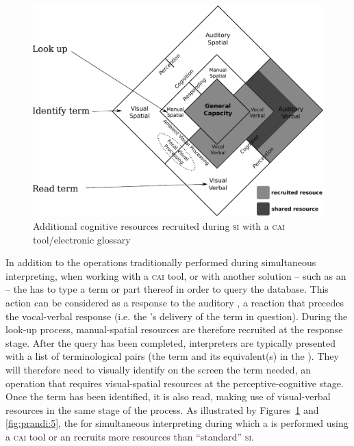 \documentclass[output=paper]{langsci/langscibook}
\begin{document}
\begin{figure}[t]
        \includegraphics[height=.4\textheight]{figures/fig2-4.pdf}
\caption{Additional cognitive resources recruited during \textsc{si} with a \textsc{cai} tool/electronic glossary\label{fig:prandi:4}}
\end{figure}

In addition to the operations traditionally performed during simultaneous interpreting, when working with a \textsc{cai} tool, or with another  solution -- such as an  -- the  has to type a term or part thereof in order to query the database. This action can be considered as a response to the auditory , a reaction that precedes the vocal-verbal response (i.e. the ’s delivery of the term in question). During the look-up process, manual-spatial resources are therefore recruited at the response stage. After the query has been completed, interpreters are typically presented with a list of terminological pairs (the term and its equivalent(s) in the ). They will therefore need to visually identify on the screen the term needed, an operation that requires visual-spatial resources at the perceptive-cognitive stage. Once the term has been identified, it is also read, making use of visual-verbal resources in the same stage of the process. As illustrated by Figures~\ref{fig:prandi:4} and \ref{fig:prandi:5}, the  for simultaneous interpreting during which a  is performed using a \textsc{cai} tool or an  recruits more resources than ``standard'' \textsc{si}. 
\end{document}
